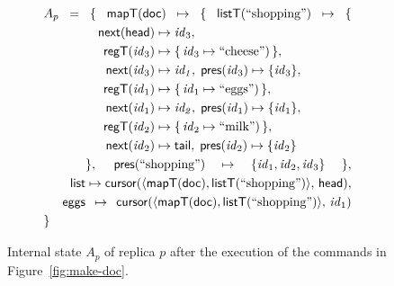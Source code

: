 \documentclass[10pt,journal,compsoc]{IEEEtran}
\newcommand{\multialign}[2]{%
  \multispan{#1}\mbox{$\displaystyle{}#2$}%
}
\begin{document}
\begin{figure}
\centering \begin{alignat*}{3}
& \multialign{5}{A_p = \{\; \mathsf{mapT}(\mathsf{doc}) \mapsto \{\;
    \mathsf{listT}(\text{``shopping''}) \mapsto \{ } \\
&&&& \mathsf{next}(\mathsf{head}) & \mapsto \mathit{id}_3, \\
&&&& \mathsf{regT}(\mathit{id}_3) & \mapsto \{\,\mathit{id}_3 \mapsto \text{``cheese''})\,\}, \\
&&&& \mathsf{next}(\mathit{id}_3) & \mapsto \mathit{id_1},\; \mathsf{pres}(\mathit{id}_3) \mapsto \{\mathit{id}_3\}, \\
&&&& \mathsf{regT}(\mathit{id}_1) & \mapsto \{\,\mathit{id}_1 \mapsto \text{``eggs''})\,\}, \\
&&&& \mathsf{next}(\mathit{id}_1) & \mapsto \mathit{id_2},\; \mathsf{pres}(\mathit{id}_1) \mapsto \{\mathit{id}_1\}, \\
&&&& \mathsf{regT}(\mathit{id}_2) & \mapsto \{\,\mathit{id}_2 \mapsto \text{``milk''})\,\}, \\
&&&& \mathsf{next}(\mathit{id}_2) & \mapsto \mathsf{tail},\; \mathsf{pres}(\mathit{id}_2) \mapsto \{\mathit{id}_2\} \\
&&& \multialign{3}{\},\;
    \mathsf{pres}(\text{``shopping''}) \mapsto \{\mathit{id}_1, \mathit{id}_2, \mathit{id}_3\} \;\},} \\
&& \mathsf{list} & \multialign{3}{\mapsto \mathsf{cursor}(\langle \mathsf{mapT}(\mathsf{doc}),%
    \mathsf{listT}(\text{``shopping''})\rangle,\, \mathsf{head}),} \\
&& \mathsf{eggs} & \multialign{3}{\mapsto \mathsf{cursor}(\langle \mathsf{mapT}(\mathsf{doc}),%
    \mathsf{listT}(\text{``shopping''})\rangle,\, \mathit{id}_1)} \\
& \}
\end{alignat*}
\caption{Internal state $A_p$ of replica $p$ after the execution of the commands in Figure~\ref{fig:make-doc}.}\label{fig:state-example}
\end{figure}
\end{document}
